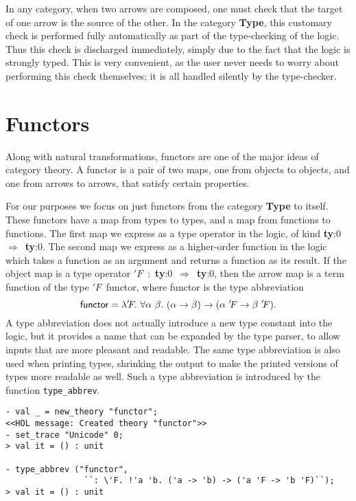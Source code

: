 In any category, when two arrows are composed, one must check
that the target of one arrow is the source of the other.
In the category {\bf Type}, this customary check is performed fully automatically
as part of the type-checking of the logic.
Thus this check is discharged immediately,
simply due to the fact that the \HOLW{} logic is strongly typed. This is very
convenient, as the user never needs to worry about performing this check
themselves; it is all handled silently by the type-checker.

\section{Functors}

Along with natural transformations,
functors are one of the major ideas of category theory.
A functor is a pair of two maps, one from objects to objects,
and one from arrows to arrows, that satisfy certain properties.

For our purposes we focus on just functors from the category {\bf Type} to itself.
These functors have a map from types to types, and a map from functions to
functions. The first map we express as a type operator in the \HOLW{} logic,
of kind {\bf ty}{:}0~$\Rightarrow$~{\bf ty}{:}0. 
The second map we express as a higher-order function in the logic
which takes a function as an argument and returns a function as its result.
If the object map is a type operator
$'\!F$~:~{\bf ty}{:}0~$\Rightarrow$~{\bf ty}{:}0,
then the arrow map is a term function of the type $'\!F$~{\sf functor},
where {\sf functor} is the type abbreviation
$$\mbox{\textsf{functor}} =
\lambda '\!F .\
\forall \alpha \ \beta.\ (\alpha \rightarrow \beta)
\rightarrow (\alpha\ '\!F \rightarrow \beta\ '\!F).$$
A type abbreviation does not actually introduce a new type constant into the
logic, but it provides a name that can be expanded by the type parser,
to allow inputs that are more pleasant and readable. The same type abbreviation
is also used when printing types, shrinking the output to make the printed
versions of types more readable as well. Such a type abbreviation is
introduced by the \ML{} function \texttt{type\_abbrev}.

\setcounter{sessioncount}{0}
\begin{session}
\begin{verbatim}
- val _ = new_theory "functor";
<<HOL message: Created theory "functor">>
- set_trace "Unicode" 0;
> val it = () : unit

- type_abbrev ("functor",
                ``: \'F. !'a 'b. ('a -> 'b) -> ('a 'F -> 'b 'F)``);
> val it = () : unit
\end{verbatim}
\end{session}

